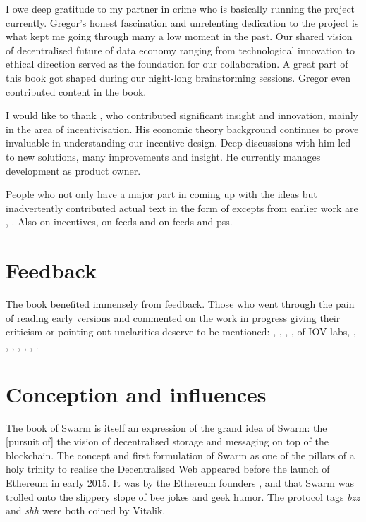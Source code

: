 I owe deep gratitude to my partner in crime  who is basically running the project currently. Gregor's honest fascination and unrelenting dedication to the project is what kept me going through many a low moment in the past. Our shared vision of decentralised future of data economy ranging from technological innovation to ethical direction served as the foundation for our collaboration. A great part of this book got shaped during our night-long brainstorming sessions. Gregor even contributed content in the book.

I would like to thank , who contributed significant insight and innovation, mainly in the area of incentivisation. His economic theory background continues to prove invaluable in understanding our incentive design. Deep discussions with him led to new solutions, many improvements and insight. He currently manages development as product owner.

People who not only have a major part in coming up with the ideas but inadvertently contributed actual text in the form of excepts from earlier work are , . Also  on incentives,  
 on feeds and  on feeds and pss. 

\section*{Feedback}

The book benefited immensely from feedback. Those who went through the pain of reading early versions and commented on the work in progress giving their criticism or pointing out unclarities deserve to be mentioned: , , , ,  of IOV labs, 
, , 
, ,  , , .



\section*{Conception and influences}

The book of Swarm is itself an expression of the grand idea of Swarm: the [pursuit of] the vision of decentralised storage and messaging on top of the blockchain. The concept and first formulation of Swarm as one of the pillars of a holy trinity to realise the Decentralised Web appeared before the launch of Ethereum in early 2015. It was by the Ethereum founders ,  and  that Swarm was trolled onto the slippery slope of bee jokes and geek humor. The protocol tags \emph{bzz} and \emph{shh} were both coined by Vitalik. 

